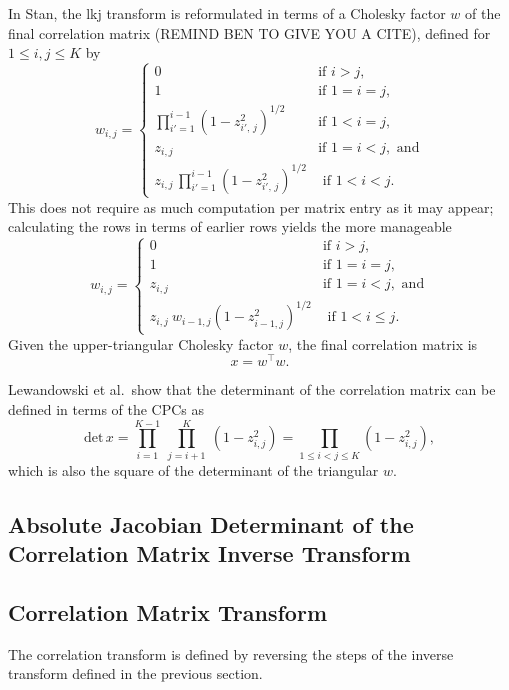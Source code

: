 \documentclass[10pt]{report}
\newcommand{\Stan}{Stan\xspace}
\newcommand{\acronym}[1]{{\sc #1}\xspace}
\newcommand{\LKJ}{\acronym{lkj}}
\begin{document}
In \Stan, the \LKJ transform is reformulated in terms of a Cholesky factor $w$
of the final correlation matrix (REMIND BEN TO GIVE YOU A CITE), defined for $1 \leq i,j \leq K$ by
%
\[
w_{i,j} = 
\left\{
\begin{array}{cl}
%
0 & \mbox{if } i > j,
\\[4pt]
1 & \mbox{if } 1 = i = j,
\\[12pt]
\prod_{i'=1}^{i - 1} \left( 1 - z_{i'\!,\,j}^2 \right)^{1/2}
& \mbox{if } 1 < i = j,
\\[12pt]
z_{i,j} & \mbox{if } 1 = i < j, \mbox{ and}
\\[12pt]
z_{i,j} \, \prod_{i'=1}^{i-1} \left( 1 - z_{i'\!,\,j}^2 \right)^{1/2}
& \mbox{ if } 1 < i < j.
%
\end{array}
\right.
\]
%
This does not require as much computation per matrix entry as it may appear; 
calculating the rows in terms of earlier rows yields the more manageable
%
\[
w_{i,j} = 
\left\{
\begin{array}{cl}
%
0 & \mbox{if } i > j,
\\[4pt]
1 & \mbox{if } 1 = i = j, 
\\[8pt]
z_{i,j} & \mbox{if } 1 = i < j, \mbox{ and}
\\[8pt]
z_{i,j} \ w_{i-1,j} \left( 1 - z_{i-1,j}^2 \right)^{1/2}
& \mbox{ if } 1 < i \leq j.
%
\end{array}
\right.
\]
Given the upper-triangular Cholesky factor $w$, the final correlation
matrix is
\[
x = w^{\top} w.
\]

Lewandowski et al.\ show that the determinant of the correlation
matrix can be defined in terms of the CPCs as
%
\[
\mbox{det} \, x = \prod_{i=1}^{K-1} \ \prod_{j=i+1}^K \ (1 - z_{i,j}^2)
 = \prod_{1 \leq i < j \leq K} (1 - z_{i,j}^2),
\]
which is also the square of the determinant of the triangular $w$.

\subsection{Absolute Jacobian Determinant of the Correlation
  Matrix Inverse Transform}

\subsection{Correlation Matrix Transform}

The correlation transform is defined by reversing the steps of the
inverse transform defined in the previous section.  
\end{document}
